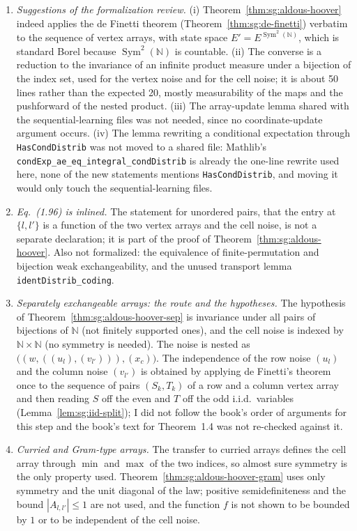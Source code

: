 \begin{remark}
\begin{enumerate}
\item \emph{Suggestions of the formalization review.} (i) Theorem~\ref{thm:sg:aldous-hoover} indeed applies the de Finetti theorem (Theorem~\ref{thm:sg:de-finetti}) verbatim to the sequence of vertex arrays, with state space $E'=E^{\operatorname{Sym}^2(\mathbb N)}$, which is standard Borel because $\operatorname{Sym}^2(\mathbb N)$ is countable. (ii) The converse is a reduction to the invariance of an infinite product measure under a bijection of the index set, used for the vertex noise and for the cell noise; it is about 50 lines rather than the expected 20, mostly measurability of the maps and the pushforward of the nested product. (iii) The array-update lemma shared with the sequential-learning files was not needed, since no coordinate-update argument occurs. (iv) The lemma rewriting a conditional expectation through \texttt{HasCondDistrib} was not moved to a shared file: Mathlib's \texttt{condExp\_ae\_eq\_integral\_condDistrib} is already the one-line rewrite used here, none of the new statements mentions \texttt{HasCondDistrib}, and moving it would only touch the sequential-learning files.
\item \emph{Eq.~(1.96) is inlined.} The statement for unordered pairs, that the entry at $\{l,l'\}$ is a function of the two vertex arrays and the cell noise, is not a separate declaration; it is part of the proof of Theorem~\ref{thm:sg:aldous-hoover}. Also not formalized: the equivalence of finite-permutation and bijection weak exchangeability, and the unused transport lemma \texttt{identDistrib\_coding}.
\item \emph{Separately exchangeable arrays: the route and the hypotheses.} The hypothesis of Theorem~\ref{thm:sg:aldous-hoover-sep} is invariance under all pairs of bijections of $\mathbb N$ (not finitely supported ones), and the cell noise is indexed by $\mathbb N\times\mathbb N$ (no symmetry is needed). The noise is nested as $\big((w,((u_l),(v_{l'}))),(x_c)\big)$. The independence of the row noise $(u_l)$ and the column noise $(v_{l'})$ is obtained by applying de Finetti's theorem once to the sequence of pairs $(S_k,T_k)$ of a row and a column vertex array and then reading $S$ off the even and $T$ off the odd i.i.d.\ variables (Lemma~\ref{lem:sg:iid-split}); I did not follow the book's order of arguments for this step and the book's text for Theorem~1.4 was not re-checked against it.
\item \emph{Curried and Gram-type arrays.} The transfer to curried arrays defines the cell array through $\min$ and $\max$ of the two indices, so almost sure symmetry is the only property used. Theorem~\ref{thm:sg:aldous-hoover-gram} uses only symmetry and the unit diagonal of the law; positive semidefiniteness and the bound $|A_{l,l'}|\le1$ are not used, and the function $f$ is not shown to be bounded by $1$ or to be independent of the cell noise.

\end{enumerate}
\end{remark}
